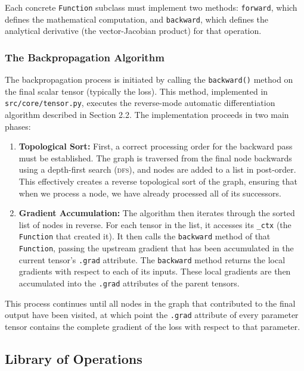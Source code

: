 \documentclass[a4paper]{article}
\newcommand{\acronym}[1]{\textsc{#1}}
\begin{document}
Each concrete \texttt{Function} subclass must implement two methods: \texttt{forward}, which defines the mathematical computation, and \texttt{backward}, which defines the analytical derivative (the vector-Jacobian product) for that operation.

\subsubsection{The Backpropagation Algorithm}

The backpropagation process is initiated by calling the \texttt{backward()} method on the final scalar tensor (typically the loss). This method, implemented in \texttt{src/core/tensor.py}, executes the reverse-mode automatic differentiation algorithm described in Section 2.2. The implementation proceeds in two main phases:

\begin{enumerate}
    \item \textbf{Topological Sort:} First, a correct processing order for the backward pass must be established. The graph is traversed from the final node backwards using a depth-first search (\acronym{dfs}), and nodes are added to a list in post-order. This effectively creates a reverse topological sort of the graph, ensuring that when we process a node, we have already processed all of its successors.

    \item \textbf{Gradient Accumulation:} The algorithm then iterates through the sorted list of nodes in reverse. For each tensor in the list, it accesses its \texttt{\_ctx} (the \texttt{Function} that created it). It then calls the \texttt{backward} method of that \texttt{Function}, passing the upstream gradient that has been accumulated in the current tensor's \texttt{.grad} attribute. The \texttt{backward} method returns the local gradients with respect to each of its inputs. These local gradients are then accumulated into the \texttt{.grad} attributes of the parent tensors.
\end{enumerate}

This process continues until all nodes in the graph that contributed to the final output have been visited, at which point the \texttt{.grad} attribute of every parameter tensor contains the complete gradient of the loss with respect to that parameter.

\subsection{Library of Operations}
\end{document}
